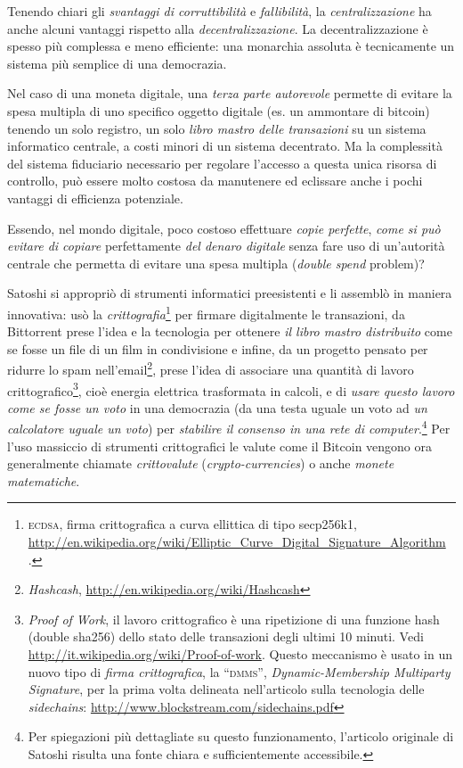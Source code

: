 \documentclass[a4paper,12pt,italian]{article}
\newcommand{\longurl}[1]{%
\href{#1}{\ttfamily \smaller #1}%
}%
\begin{document}
Tenendo chiari gli \emph{svantaggi di corruttibilità} e \emph{fallibilità}, la \emph{centralizzazione} 
ha anche alcuni vantaggi rispetto alla \emph{decentralizzazione}. La decentralizzazione è spesso più
complessa e meno efficiente: una monarchia assoluta è tecnicamente un sistema
più semplice di una democrazia. 

\smallskip


Nel caso di una moneta digitale, una \emph{terza parte autorevole} permette di evitare la spesa multipla
di uno specifico oggetto digitale (es. un ammontare di bitcoin) tenendo un solo registro, un solo \emph{libro mastro delle transazioni} su 
un sistema informatico centrale, a costi minori di un sistema decentrato. Ma la complessità del sistema fiduciario necessario per 
regolare l'accesso a questa unica risorsa di controllo, può essere molto costosa da manutenere ed eclissare anche i pochi vantaggi di efficienza potenziale.

\smallskip
Essendo, nel mondo digitale, poco costoso effettuare \emph{copie perfette},
\emph{come si può evitare di copiare} perfettamente \emph{del denaro digitale} senza fare uso di un'autorità centrale
che permetta di evitare una spesa multipla (\emph{double spend} problem)?


\smallskip

Satoshi si appropriò di strumenti informatici preesistenti e li assemblò
in maniera innovativa: usò la \emph{crittografia}\footnote{\textsc{ecdsa}, firma
crittografica a curva ellittica di tipo secp256k1, 
\longurl{http://en.wikipedia.org/wiki/Elliptic\_Curve\_Digital\_Signature\_Algorithm
}.} per firmare digitalmente le transazioni, da
Bittorrent prese
l’idea e la tecnologia per ottenere \emph{il libro mastro distribuito} come se
fosse un file di un film in condivisione e infine, da un progetto
pensato per ridurre lo spam nell'email\footnote{\emph{Hashcash},
\url{http://en.wikipedia.org/wiki/Hashcash}}, prese l’idea di associare una
quantità di lavoro crittografico\footnote{\emph{Proof of Work}, il lavoro
crittografico è una ripetizione di una funzione hash (double sha256)
dello stato delle transazioni degli ultimi 10 minuti. Vedi
\url{http://it.wikipedia.org/wiki/Proof-of-work}. Questo meccanismo è usato in un nuovo 
tipo di \emph{firma crittografica}, la ``\textsc{dmms}'', \emph{Dynamic-Membership Multiparty Signature}, per la
prima volta delineata nell'articolo sulla tecnologia delle \emph{sidechains}: \url{http://www.blockstream.com/sidechains.pdf}}, cioè energia
elettrica trasformata in calcoli, e di \emph{usare questo lavoro come se
fosse un voto} in una democrazia (da una testa uguale un voto ad \emph{un calcolatore
uguale un voto}) per \emph{stabilire il consenso in una rete di computer}.\footnote{Per
spiegazioni più dettagliate su questo funzionamento, l’articolo
originale di Satoshi risulta una fonte chiara e sufficientemente
accessibile.}
Per l'uso massiccio di strumenti crittografici le valute come il Bitcoin vengono ora generalmente chiamate
\emph{crittovalute} (\emph{crypto-currencies}) o anche \emph{monete matematiche}.
\end{document}
